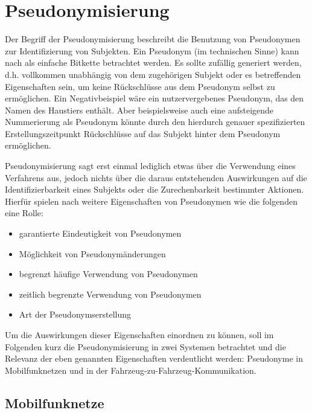 \section{Pseudonymisierung}

\label{sec_state_pseudonymity}

Der Begriff der Pseudonymisierung beschreibt die Benutzung von Pseudonymen zur Identifizierung von Subjekten. Ein Pseudonym (im technischen Sinne) kann nach \cite{pfitzmann2010} als einfache Bitkette betrachtet werden. Es sollte zufällig generiert werden, d.h. vollkommen unabhängig von dem zugehörigen Subjekt oder es betreffenden Eigenschaften sein, um keine Rückschlüsse aus dem Pseudonym selbst zu ermöglichen. Ein Negativbeispiel wäre ein nutzervergebenes Pseudonym, das den Namen des Haustiers enthält. Aber beispielsweise auch eine aufsteigende Nummerierung als Pseudonym könnte durch den hierdurch genauer spezifizierten Erstellungszeitpunkt Rückschlüsse auf das Subjekt hinter dem Pseudonym ermöglichen.

Pseudonymisierung sagt erst einmal lediglich etwas über die Verwendung eines Verfahrens aus, jedoch nichts über die daraus entstehenden Auswirkungen auf die Identifizierbarkeit eines Subjekts oder die Zurechenbarkeit bestimmter Aktionen. Hierfür spielen nach \cite{pfitzmann2001} weitere Eigenschaften von Pseudonymen wie die folgenden eine Rolle:
\begin{itemize}
  \item garantierte Eindeutigkeit von Pseudonymen
  \item Möglichkeit von Pseudonymänderungen
  \item begrenzt häufige Verwendung von Pseudonymen 
  \item zeitlich begrenzte Verwendung von Pseudonymen
  \item Art der Pseudonymserstellung
\end{itemize}

Um die Auswirkungen dieser Eigenschaften einordnen zu können, soll im Folgenden kurz die Pseudonymisierung in zwei Systemen betrachtet und die Relevanz der eben genannten Eigenschaften verdeutlicht werden: Pseudonyme in Mobilfunknetzen und in der Fahrzeug-zu-Fahrzeug-Kommunikation. 

\subsection{Mobilfunknetze}

